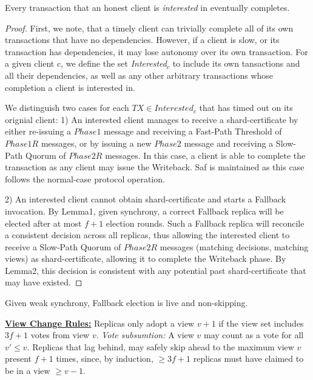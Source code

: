 \begin{theorem}[Liv] 
Every transaction that an honest client is \textit{interested} in eventually completes.
\end{theorem}

\begin{proof}
First, we note, that a timely client can trivially complete all of its own transactions that have no dependencies. However, if a client is slow, or its transaction has dependencies, it may lose autonomy over its own transaction. For a given client c, we define the set \textit{Interested$_c$} to include its own tansactions and all their dependencies, as well as any other arbitrary transactions whose completion a client is interested in. 

We distinguish two cases for each $TX \in Interested_c$ that has timed out on its orignial client: 
1) An interested client manages to receive a shard-certificate by either re-issuing a $Phase1$ message and receiving a Fast-Path Threshold of $Phase1R$ messages, or by issuing a new $Phase2$ message and receiving a Slow-Path Quorum of $Phase2R$ messages. In this case, a client is able to complete the transaction as any client may issue the Writeback. Saf is maintained as this case follows the normal-case protocol operation.

2) An interested client cannot obtain shard-certificate and starts a Fallback invocation. By Lemma1, given synchrony, a correct Fallback replica will be elected after at most $f+1$ election rounds. Such a Fallback replica will reconcile a consistent decision across all replicas, thus allowing the interested client to receive a Slow-Path Quorum of $Phase2R$ messages (matching decisions, matching views) as shard-certificate, allowing it to complete the Writeback phase. By Lemma2, this decision is consistent with any potential past shard-certificate that may have existed.

\end{proof}



\begin{lemma}
Given weak synchrony, Fallback election is live and non-skipping.
\end{lemma}

\underline{\textbf{View Change Rules:}} \one Replicas only adopt a view $v+1$ if the view set includes $3f+1$ votes from view $v$. \textit{Vote subsumtion:} A view $v$ may count as a vote for all $v' \leq v$. \two Replicas that lag behind, may safely skip ahead to the maximum view $v$ present $f+1$ times, since, by induction, $\geq 3f+1$ replicas must have claimed to be in a view $\geq v-1$. 

